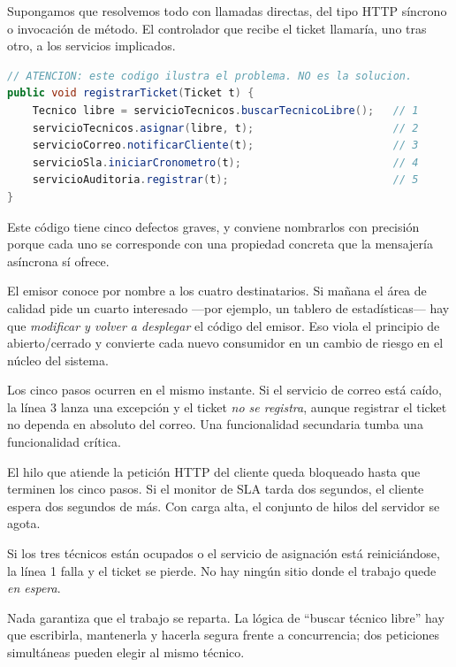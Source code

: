 \documentclass[11pt,a4paper]{book}
\begin{document}
Supongamos que resolvemos todo con llamadas directas, del tipo HTTP síncrono o invocación de método.
El controlador que recibe el ticket llamaría, uno tras otro, a los servicios implicados.

\begin{lstlisting}[language=Java,caption={Solución ingenua: acoplamiento total (no usar)},label={lst:ingenua}]
// ATENCION: este codigo ilustra el problema. NO es la solucion.
public void registrarTicket(Ticket t) {
	Tecnico libre = servicioTecnicos.buscarTecnicoLibre();   // 1
	servicioTecnicos.asignar(libre, t);                      // 2
	servicioCorreo.notificarCliente(t);                      // 3
	servicioSla.iniciarCronometro(t);                        // 4
	servicioAuditoria.registrar(t);                          // 5
}
\end{lstlisting}

Este código tiene cinco defectos graves, y conviene nombrarlos con precisión porque cada uno se corresponde con una propiedad concreta que la mensajería asíncrona sí ofrece.

\begin{description}[leftmargin=1.6em,style=nextline,itemsep=4pt]
	\item[Acoplamiento espacial.] El emisor conoce por nombre a los cuatro destinatarios. Si mañana el área de calidad pide un cuarto interesado ---por ejemplo, un tablero de estadísticas--- hay que \emph{modificar y volver a desplegar} el código del emisor. Eso viola el principio de abierto/cerrado y convierte cada nuevo consumidor en un cambio de riesgo en el núcleo del sistema.
	\item[Acoplamiento temporal.] Los cinco pasos ocurren en el mismo instante. Si el servicio de correo está caído, la línea 3 lanza una excepción y el ticket \emph{no se registra}, aunque registrar el ticket no dependa en absoluto del correo. Una funcionalidad secundaria tumba una funcionalidad crítica.
	\item[Acoplamiento de sincronización.] El hilo que atiende la petición HTTP del cliente queda bloqueado hasta que terminen los cinco pasos. Si el monitor de SLA tarda dos segundos, el cliente espera dos segundos de más. Con carga alta, el conjunto de hilos del servidor se agota.
	\item[Pérdida bajo indisponibilidad.] Si los tres técnicos están ocupados o el servicio de asignación está reiniciándose, la línea 1 falla y el ticket se pierde. No hay ningún sitio donde el trabajo quede \emph{en espera}.
	\item[Ausencia de balanceo.] Nada garantiza que el trabajo se reparta. La lógica de ``buscar técnico libre'' hay que escribirla, mantenerla y hacerla segura frente a concurrencia; dos peticiones simultáneas pueden elegir al mismo técnico.
\end{description}
\end{document}
